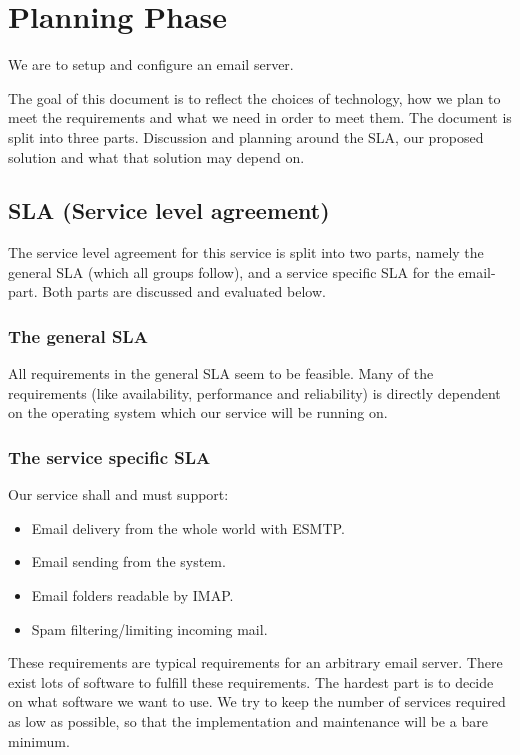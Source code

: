 \documentclass[12pt]{article}
\begin{document}

\tableofcontents

\section{Planning Phase}

We are to setup and configure an email server.

The goal of this document is to reflect the choices of technology, how
we plan to meet the requirements and what we need in order to meet them.
The document is split into three parts. Discussion and planning around
the SLA, our proposed solution and what that solution may depend on.

\subsection{SLA (Service level agreement)}
The service level agreement for this service is split into two parts,
namely the general SLA (which all groups follow), and a service specific
SLA for the email-part. Both parts are discussed and evaluated below.

\subsubsection{The general SLA}
All requirements in the general SLA seem to be feasible. Many of the
requirements (like availability, performance and reliability) is
directly dependent on the operating system which our service will be
running on. 


\subsubsection{The service specific SLA}
Our service shall and must support:
\begin{itemize}
\item{Email delivery from the whole world with ESMTP.}
\item{Email sending from the system.}
\item{Email folders readable by IMAP.}
\item{Spam filtering/limiting incoming mail.}
\end{itemize}

These requirements are typical requirements for an arbitrary email
server. There exist lots of software to fulfill these requirements. The
hardest part is to decide on what software we want to use. We try to
keep the number of services required as low as possible, so that the
implementation and maintenance will be a bare minimum.
\end{document}
